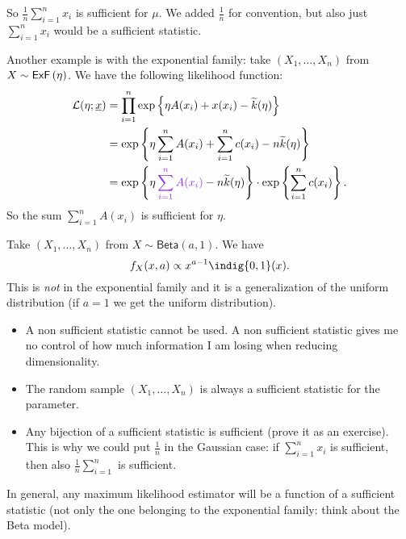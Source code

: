 \documentclass[12pt]{report}
\begin{document}
So $\frac{1}{n}\sum_{i=1}^{n}x_{i}$ is sufficient for $\mu$. We added $\frac{1}{n}$ for convention, but also just $\sum_{i=1}^{n}x_{i}$ would be a sufficient statistic. \par
Another example is with the exponential family: take $(X_{1},\ldots,X_{n})$ from $X\sim\mathsf{ExF}\left(\eta\right)$. We have the following likelihood function:
\begin{align*}
	\mathcal{L}(\eta;\ulx)&=\prod_{i=1}^{n}\expg{\eta A(x_{i})+x(x_{i})-\widetilde{k}(\eta)}\\
	&=\expg{\eta\sum_{i=1}^{n}A(x_{i})+\sum_{i=1}^{n}c(x_{i})-n\widetilde{k}(\eta)}\\
	&=\expg{\eta\mathcolor{Purple2}{\sum_{i=1}^{n}A(x_{i})}-n\widetilde{k}(\eta)}\cdot\expg{\sum_{i=1}^{n}c(x_{i})}.
\end{align*}
So the sum $\sum_{i=1}^{n}A(x_{i})$ is sufficient for $\eta$.\par
Take $(X_{1},\ldots,X_{n})$ from $X\sim\mathsf{Beta}(a,1)$. We have
\begin{equation*}
	f_{X}(x,a)\propto x^{a-1}\indig{0,1}(x).
\end{equation*}
This is \textit{not} in the exponential family and it is a generalization of the uniform distribution (if $a=1$ we get the uniform distribution).
\begin{remark}
	\begin{itemize}
		\item  A non sufficient statistic cannot be used. A non sufficient statistic gives me no control of how much information I am losing when reducing dimensionality. 
		\item The random sample $(X_{1},\ldots,X_{n})$ is always a sufficient statistic for the parameter.
		\item Any bijection of a sufficient statistic is sufficient (prove it as an exercise). This is why we could put $\frac{1}{n}$ in the Gaussian case: if $\sum_{i=1}^{n}x_{i}$ is sufficient, then also $\frac{1}{n}\sum_{i=1}^{n}$ is sufficient.
	\end{itemize}
\end{remark}
In general, any maximum likelihood estimator will be a function of a sufficient statistic (not only the one belonging to the exponential family: think about the Beta model).
\end{document}
